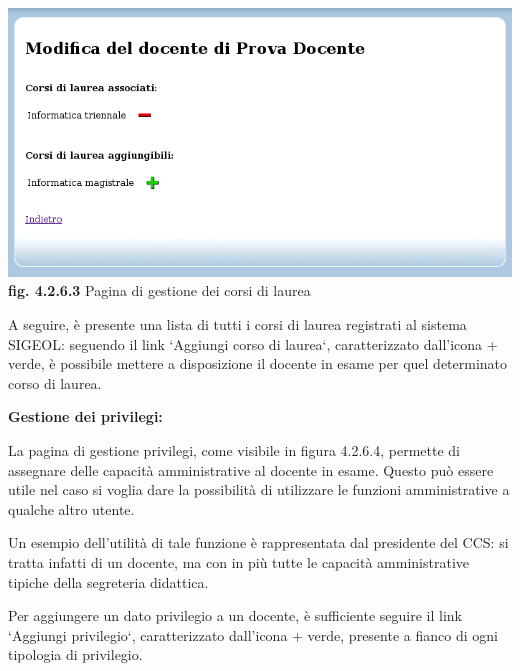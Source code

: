 \documentclass[11pt,a4paper]{article}
\begin{document}
\bigskip
\begin{center}
	\includegraphics[scale=0.5]{images/gestione_corsi.jpg}\\
	\textbf{fig. 4.2.6.3} Pagina di gestione dei corsi di laurea\\
\end{center}
\bigskip

A seguire, è presente una lista di tutti i corsi di laurea registrati al sistema SIGEOL: seguendo il link `Aggiungi corso di laurea`, caratterizzato dall'icona + verde, è possibile mettere a disposizione il docente in esame per quel determinato corso di laurea.
\newline \newline
\begin{large}\textbf{Gestione dei privilegi:}\end{large}
\newline \newline
La pagina di gestione privilegi, come visibile in figura 4.2.6.4, permette di assegnare delle capacità amministrative al docente in esame. Questo può essere utile nel caso si voglia dare la possibilità di utilizzare le funzioni amministrative a qualche altro utente.

Un esempio dell'utilità di tale funzione è rappresentata dal presidente del CCS: si tratta infatti di un docente, ma con in più tutte le capacità amministrative tipiche della segreteria didattica.

Per aggiungere un dato privilegio a un docente, è sufficiente seguire il link `Aggiungi privilegio`, caratterizzato dall'icona + verde, presente a fianco di ogni tipologia di privilegio.
\end{document}
